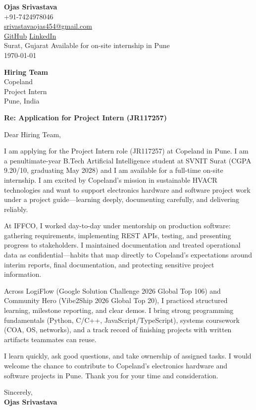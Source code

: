 \documentclass[a4paper,11pt]{article}
\begin{document}
\begin{flushright}
\textbf{Ojas Srivastava} \\
+91-7424978046 \\
\href{mailto:srivastavaojas454@gmail.com}{srivastavaojas454@gmail.com} \\
\href{https://github.com/Ojas-Srivastava05}{GitHub} \textbar{}
\href{https://linkedin.com/in/ojas-srivastava05}{LinkedIn} \\
Surat, Gujarat \textbar{} Available for on-site internship in Pune \\
\today
\end{flushright}

\vspace{4mm}
\textbf{Hiring Team} \\
Copeland \\
Project Intern \\
Pune, India

\vspace{2mm}
\textbf{Re: Application for Project Intern (JR117257)}

Dear Hiring Team,

I am applying for the Project Intern role (JR117257) at Copeland in Pune. I am a penultimate-year B.Tech Artificial Intelligence student at SVNIT Surat (CGPA 9.20/10, graduating May 2028) and I am available for a full-time on-site internship. I am excited by Copeland's mission in sustainable HVACR technologies and want to support electronics hardware and software project work under a project guide---learning deeply, documenting carefully, and delivering reliably.

At IFFCO, I worked day-to-day under mentorship on production software: gathering requirements, implementing REST APIs, testing, and presenting progress to stakeholders. I maintained documentation and treated operational data as confidential---habits that map directly to Copeland's expectations around interim reports, final documentation, and protecting sensitive project information.

Across LogiFlow (Google Solution Challenge 2026 Global Top 106) and Community Hero (Vibe2Ship 2026 Global Top 20), I practiced structured learning, milestone reporting, and clear demos. I bring strong programming fundamentals (Python, C/C++, JavaScript/TypeScript), systems coursework (COA, OS, networks), and a track record of finishing projects with written artifacts teammates can reuse.

I learn quickly, ask good questions, and take ownership of assigned tasks. I would welcome the chance to contribute to Copeland's electronics hardware and software projects in Pune. Thank you for your time and consideration.

Sincerely, \\
\vspace{8mm}
\textbf{Ojas Srivastava}
\end{document}

